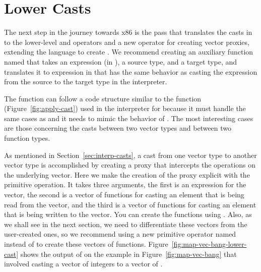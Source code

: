 \documentclass[11pt]{book}
\begin{document}
\section{Lower Casts}
\label{sec:lower-casts}

The next step in the journey towards x86 is the 
pass that translates the casts in \LangCast{} to the lower-level
 and  operators and a new operator for
creating vector proxies, extending the \LangLoop{} language to create
\LangProxy{}. We recommend creating an auxiliary function named
 that takes an expression (in \LangCast{}), a source type,
and a target type, and translates it to expression in \LangProxy{} that has
the same behavior as casting the expression from the source to the
target type in the interpreter.

The  function can follow a code structure similar to
the  function (Figure~\ref{fig:apply-cast}) used in
the interpreter for \LangCast{} because it must handle the same cases as
 and it needs to mimic the behavior of
. The most interesting cases are those concerning the
casts between two vector types and between two function types.

As mentioned in Section~\ref{sec:interp-casts}, a cast from one vector
type to another vector type is accomplished by creating a proxy that
intercepts the operations on the underlying vector. Here we make the
creation of the proxy explicit with the  primitive
operation. It takes three arguments, the first is an expression for
the vector, the second is a vector of functions for casting an element
that is being read from the vector, and the third is a vector of
functions for casting an element that is being written to the vector.
You can create the functions using . Also, as we shall
see in the next section, we need to differentiate these vectors from
the user-created ones, so we recommend using a new primitive operator
named  instead of  to create these
vectors of functions. Figure~\ref{fig:map-vec-bang-lower-cast} shows
the output of  on the example in
Figure~\ref{fig:map-vec-bang} that involved casting a vector of
integers to a vector of .
\end{document}

